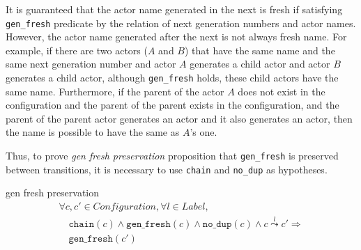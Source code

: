 It is guaranteed that the actor name generated in the next is fresh if satisfying \texttt{gen\_fresh} predicate by the relation of next generation numbers and actor names. %
However, the actor name generated after the next is not always fresh name.
For example, if there are two actors ($A$ and $B$) that have the same name and the same next generation number and actor $A$ generates a child actor and actor $B$ generates a child actor, although \texttt{gen\_fresh} holds, these child actors have the same name.
Furthermore, if the parent of the actor $A$ does not exist in the configuration and the parent of the parent exists in the configuration, and the parent of the parent actor generates an actor and it also generates an actor, then the name is possible to have the same as $A$'s one.


Thus, to prove \textit{gen fresh preservation} proposition that \texttt{gen\_fresh} is preserved between transitions, it is necessary to use \texttt{chain} and \texttt{no\_dup} as hypotheses.

\begin{lemma}{gen fresh preservation}
\begin{displaymath}
  \begin{array}{l}
    \forall c, c' \in \textit{Configuration}, \forall l \in \textit{Label}, \\
    \quad \texttt{chain}(c) \wedge \texttt{gen\_fresh}(c) \wedge \texttt{no\_dup}(c) \wedge c \overset{l}{\leadsto} c' \Rightarrow \\
    \quad \texttt{gen\_fresh}(c')
  \end{array}
\end{displaymath}
\end{lemma}

